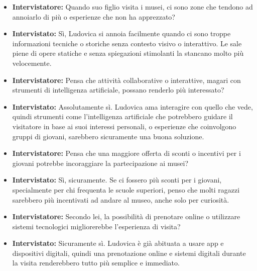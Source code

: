 \documentclass{article}
\begin{document}
\begin{itemize}
    \item \textbf{Intervistatore:} Quando suo figlio visita i musei, ci sono zone che tendono ad annoiarlo di più o esperienze che non ha apprezzato?
    \item \textbf{Intervistato:} Sì, Ludovica si annoia facilmente quando ci sono troppe informazioni tecniche o storiche senza contesto visivo o interattivo. Le sale piene di opere statiche e senza spiegazioni stimolanti la stancano molto più velocemente.
    
    \item \textbf{Intervistatore:} Pensa che attività collaborative o interattive, magari con strumenti di intelligenza artificiale, possano renderlo più interessato?
    \item \textbf{Intervistato:} Assolutamente sì. Ludovica ama interagire con quello che vede, quindi strumenti come l’intelligenza artificiale che potrebbero guidare il visitatore in base ai suoi interessi personali, o esperienze che coinvolgono gruppi di giovani, sarebbero sicuramente una buona soluzione.
    
    \item \textbf{Intervistatore:} Pensa che una maggiore offerta di sconti o incentivi per i giovani potrebbe incoraggiare la partecipazione ai musei?
    \item \textbf{Intervistato:} Sì, sicuramente. Se ci fossero più sconti per i giovani, specialmente per chi frequenta le scuole superiori, penso che molti ragazzi sarebbero più incentivati ad andare al museo, anche solo per curiosità.
    
    \item \textbf{Intervistatore:} Secondo lei, la possibilità di prenotare online o utilizzare sistemi tecnologici migliorerebbe l’esperienza di visita?
    \item \textbf{Intervistato:} Sicuramente sì. Ludovica è già abituata a usare app e dispositivi digitali, quindi una prenotazione online e sistemi digitali durante la visita renderebbero tutto più semplice e immediato.
\end{itemize}
\end{document}
